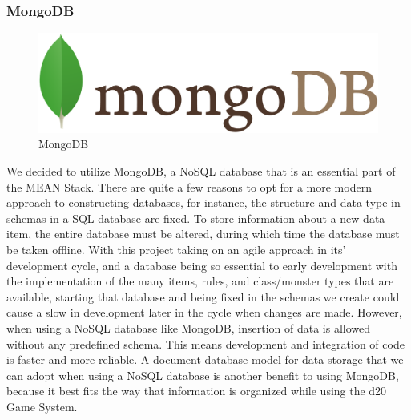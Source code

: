 \documentclass[12pt,a4paper]{report}
\begin{document}
			\subsubsection{MongoDB}
			\begin{figure}
				\includegraphics[scale=0.05]{mongoDB}
				\caption{MongoDB}
				\label{fig: MongoDB}
			\end{figure}
			We decided to utilize MongoDB, a NoSQL database that is an essential part of the MEAN Stack. There are quite a few reasons to opt for a more modern approach to constructing databases, for instance, the structure and data type in schemas in a SQL database are fixed. To store information about a new data item, the entire database must be altered, during which time the database must be taken offline. With this project taking on an agile approach in its’ development cycle, and a database being so essential to early development with the implementation of the many items, rules, and class/monster types that are available, starting that database and being fixed in the schemas we create could cause a slow in development later in the cycle when changes are made. However, when using a NoSQL database like MongoDB, insertion of data is allowed without any predefined schema. This means development and integration of code is faster and more reliable. A document database model for data storage that we can adopt when using a NoSQL database is another benefit to using MongoDB, because it best fits the way that information is organized while using the d20 Game System.
			\newpage
\end{document}

